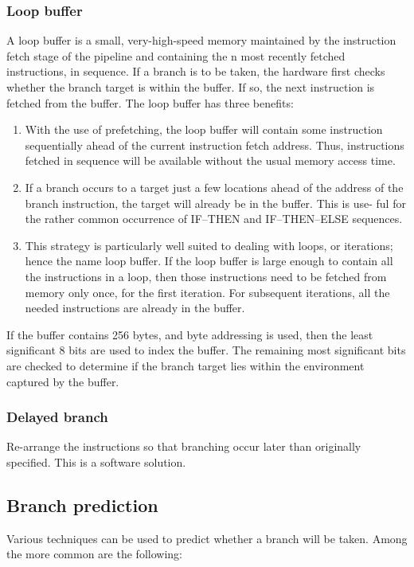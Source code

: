 \documentclass[titlepage, a4paper]{article}
\begin{document}
\subsubsection{Loop buffer}
A loop buffer is a small, very-high-speed memory maintained by the instruction fetch stage of the pipeline and containing the n most recently fetched instructions, in sequence. If a branch is to be taken, the hardware first checks whether the branch target is within the buffer. If so, the next instruction is fetched from the buffer. The loop buffer has three benefits:
\begin{enumerate}
\item With the use of prefetching, the loop buffer will contain some instruction sequentially ahead of the current instruction fetch address. Thus, instructions fetched in sequence will be available without the usual memory access time. 
\item If a branch occurs to a target just a few locations ahead of the address of the branch instruction, the target will already be in the buffer. This is use- ful for the rather common occurrence of IF–THEN and IF–THEN–ELSE sequences.
\item This strategy is particularly well suited to dealing with loops, or iterations; hence the name loop buffer. If the loop buffer is large enough to contain all the instructions in a loop, then those instructions need to be fetched from memory only once, for the first iteration. For subsequent iterations, all the needed instructions are already in the buffer.
\end{enumerate}

If the buffer contains 256 bytes, and byte addressing is used, then the least significant 8 bits are used to index the buffer. The remaining most significant bits are checked to determine if the branch target lies within the environment captured by the buffer.

\subsubsection{Delayed branch}
Re-arrange the instructions so that branching occur later than originally specified. This is a software solution.

\subsection{Branch prediction}
Various techniques can be used to predict whether a branch will be taken. Among the more common are the following:
\end{document}
